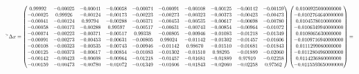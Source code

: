 \documentclass[a4paper, 12pt]{extarticle}
\begin{document}
\begin{equation*}
    \scalemath{0.7}{
        {^> \Delta x} = \begin{pmatrix}
            0.99992 & -0.00025 & -0.00041 & -0.00058 & -0.00074 & -0.00091 & -0.00108 & -0.00125 & -0.00142 & -0.00159 \\ 
            -0.00025 & 0.99926 & -0.00124 & -0.00173 & -0.00223 & -0.00273 & -0.00323 & -0.00373 & -0.00423 & -0.00473 \\ 
            -0.00041 & -0.00124 & 0.99794 & -0.00288 & -0.00371 & -0.00453 & -0.00535 & -0.00617 & -0.00698 & -0.00780 \\ 
            -0.00058 & -0.00173 & -0.00288 & 0.99597 & -0.00517 & -0.00631 & -0.00743 & -0.00854 & -0.00964 & -0.01072 \\ 
            -0.00074 & -0.00223 & -0.00371 & -0.00517 & 0.99338 & -0.00805 & -0.00946 & -0.01083 & -0.01218 & -0.01349 \\ 
            -0.00091 & -0.00273 & -0.00453 & -0.00631 & -0.00805 & 0.99024 & -0.01142 & -0.01302 & -0.01457 & -0.01606 \\ 
            -0.00108 & -0.00323 & -0.00535 & -0.00743 & -0.00946 & -0.01142 & 0.98670 & -0.01510 & -0.01681 & -0.01843 \\ 
            -0.00125 & -0.00373 & -0.00617 & -0.00854 & -0.01083 & -0.01302 & -0.01510 & 0.98295 & -0.01889 & -0.02060 \\ 
            -0.00142 & -0.00423 & -0.00698 & -0.00964 & -0.01218 & -0.01457 & -0.01681 & -0.01889 & 0.97919 & -0.02258 \\ 
            -0.00159 & -0.00473 & -0.00780 & -0.01072 & -0.01349 & -0.01606 & -0.01843 & -0.02060 & -0.02258 & 0.97562 
        \end{pmatrix}
        \begin{pmatrix}
            0.0100925000000000  \\
            -0.0102764640000000 \\ 
            0.0104578010000000  \\
            -0.0106349940000000 \\ 
            0.0108065630000000  \\
            -0.0109716940000000 \\ 
            0.0111299060000000  \\
            -0.0112804960000000 \\ 
            0.0114236860000000  \\
            -0.0115593650000000 \\
        \end{pmatrix}
        =
    }
\end{equation*}
\end{document}
